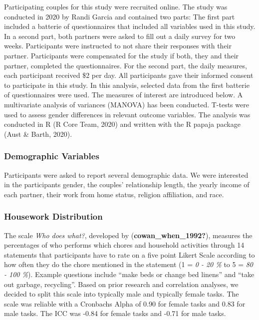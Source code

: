 \documentclass[
  man,floatsintext]{apa6}
\begin{document}
Participating couples for this study were recruited online. The study was conducted in 2020 by Randi Garcia and contained two parts: The first part included a batterie of questionnaires that included all variables used in this study. In a second part, both partners were asked to fill out a daily survey for two weeks. Participants were instructed to not share their responses with their partner. Participants were compensated for the study if both, they and their partner, completed the questionnaires. For the second part, the daily measures, each participant received \$2 per day. All participants gave their informed consent to participate in this study.
In this analysis, selected data from the first batterie of questionnaires were used. The measures of interest are introduced below.
A multivariate analysis of variances (MANOVA) has been conducted. T-tests were used to assess gender differences in relevant outcome variables.
The analysis was conducted in R (R Core Team, 2020) and written with the R papaja package (Aust \& Barth, 2020).

\hypertarget{demographic-variables}{%
\subsubsection{Demographic Variables}\label{demographic-variables}}

Participants were asked to report several demographic data. We were interested in the participants gender, the couples' relationship length, the yearly income of each partner, their work from home status, religion affiliation, and race.

\hypertarget{housework-distribution}{%
\subsubsection{Housework Distribution}\label{housework-distribution}}

The scale \emph{Who does what?}, developed by (\textbf{cowan\_when\_1992?}), measures the percentages of who performs which chores and household activities through 14 statements that participants have to rate on a five point Likert Scale according to how often they do the chore mentioned in the statement (1 = \emph{0 - 20 \%} to 5 = \emph{80 - 100 \%}). Example questions include ``make beds or change bed linens'' and ``take out garbage, recycling''. Based on prior research and correlation analyses, we decided to split this scale into typically male and typically female tasks. The scale was reliable with a Cronbachs Alpha of 0.90 for female tasks and 0.83 for male tasks. The ICC was -0.84 for female tasks and -0.71 for male tasks.
\end{document}
